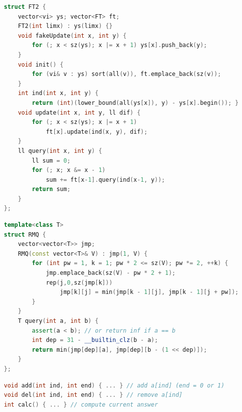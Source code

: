 \begin{multicols}{\Columns}
\begin{lstlisting}[language=C++]
struct FT2 {
	vector<vi> ys; vector<FT> ft;
	FT2(int limx) : ys(limx) {}
	void fakeUpdate(int x, int y) {
		for (; x < sz(ys); x |= x + 1) ys[x].push_back(y);
	}
	void init() {
		for (vi& v : ys) sort(all(v)), ft.emplace_back(sz(v));
	}
	int ind(int x, int y) {
		return (int)(lower_bound(all(ys[x]), y) - ys[x].begin()); }
	void update(int x, int y, ll dif) {
		for (; x < sz(ys); x |= x + 1)
			ft[x].update(ind(x, y), dif);
	}
	ll query(int x, int y) {
		ll sum = 0;
		for (; x; x &= x - 1)
			sum += ft[x-1].query(ind(x-1, y));
		return sum;
	}
};
\end{lstlisting}

\begin{lstlisting}[language=C++]
template<class T>
struct RMQ {
	vector<vector<T>> jmp;
	RMQ(const vector<T>& V) : jmp(1, V) {
		for (int pw = 1, k = 1; pw * 2 <= sz(V); pw *= 2, ++k) {
			jmp.emplace_back(sz(V) - pw * 2 + 1);
			rep(j,0,sz(jmp[k]))
				jmp[k][j] = min(jmp[k - 1][j], jmp[k - 1][j + pw]);
		}
	}
	T query(int a, int b) {
		assert(a < b); // or return inf if a == b
		int dep = 31 - __builtin_clz(b - a);
		return min(jmp[dep][a], jmp[dep][b - (1 << dep)]);
	}
};
\end{lstlisting}

\begin{lstlisting}[language=C++]
void add(int ind, int end) { ... } // add a[ind] (end = 0 or 1)
void del(int ind, int end) { ... } // remove a[ind]
int calc() { ... } // compute current answer


\end{lstlisting}
\end{multicols}
